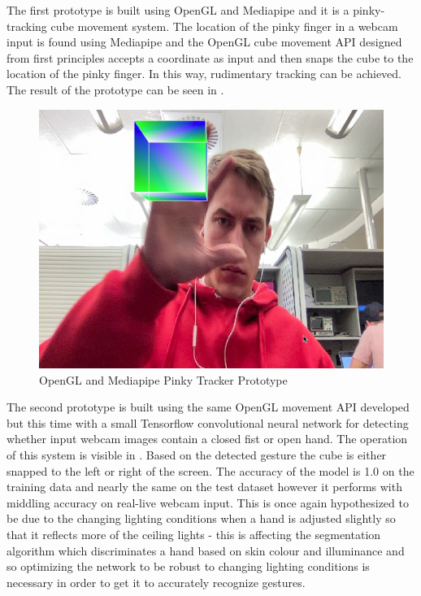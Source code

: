 The first prototype is built using OpenGL and Mediapipe and it is a pinky-tracking cube movement system. The location of the pinky finger in a webcam input is found using Mediapipe and the OpenGL cube movement API designed from first principles accepts a coordinate as input and then snaps the cube to the location of the pinky finger. In this way, rudimentary tracking can be achieved. The result of the prototype can be seen in .

\begin{figure}[h]
    \centering
    \includegraphics[width=0.6\linewidth]{figures/OpenGL_mediapipe_prototype_pinky_tracker.png}
    \caption{OpenGL and Mediapipe Pinky Tracker Prototype}
    \label{fig:OpenGL_mediapipe_prototype_pinky_tracker}
\end{figure}

The second prototype is built using the same OpenGL movement API developed but this time with a small Tensorflow convolutional neural network for detecting whether input webcam images contain a closed fist or open hand. The operation of this system is visible in . Based on the detected gesture the cube is either snapped to the left or right of the screen. The accuracy of the model is 1.0 on the training data and nearly the same on the test dataset however it performs with middling accuracy on real-live webcam input. This is once again hypothesized to be due to the changing lighting conditions when a hand is adjusted slightly so that it reflects more of the ceiling lights - this is affecting the segmentation algorithm which discriminates a hand based on skin colour and illuminance and so optimizing the network to be robust to changing lighting conditions is necessary in order to get it to accurately recognize gestures.

